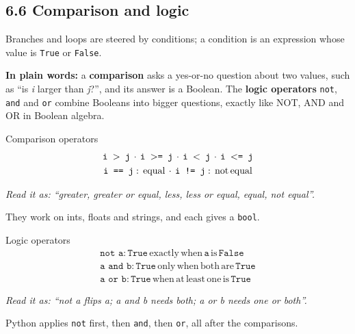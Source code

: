 \documentclass[11pt]{article}
\begin{document}
\begin{keepsection}
\section{6.6 Comparison and logic}

Branches and loops are steered by conditions; a condition is an expression whose value is \texttt{True} or \texttt{False}.

\begin{plainbox}\textbf{In plain words:} a \textbf{comparison} asks a yes-or-no question about two values, such as “is \textit{i} larger than \textit{j}?”, and its answer is a Boolean. The \textbf{logic operators} \texttt{not}, \texttt{and} and \texttt{or} combine Booleans into bigger questions, exactly like NOT, AND and OR in Boolean algebra.\end{plainbox}

\begin{equationcard}{Comparison operators}
\[ \begin{gathered} \texttt{i \ensuremath{>} j}\, \cdot \, \texttt{i \ensuremath{>}= j}\, \cdot \, \texttt{i \ensuremath{<} j}\, \cdot \, \texttt{i \ensuremath{<}= j} \\ \texttt{i == j}:\, \text{equal}\, \cdot \, \texttt{i != j}:\, \text{not}\, \text{equal} \end{gathered} \]
{\small \emph{Read it as: “greater, greater or equal, less, less or equal, equal, not equal”.}\par  They work on ints, floats and strings, and each gives a \texttt{bool}.}
\end{equationcard}

\begin{equationcard}{Logic operators}
\[ \begin{gathered} \texttt{not a}:\, \texttt{True}\, \text{exactly}\, \text{when}\, \texttt{a}\, \text{is}\, \texttt{False} \\ \texttt{a and b}:\, \texttt{True}\, \text{only}\, \text{when}\, \text{both}\, \text{are}\, \texttt{True} \\ \texttt{a or b}:\, \texttt{True}\, \text{when}\, \text{at}\, \text{least}\, \text{one}\, \text{is}\, \texttt{True} \end{gathered} \]
{\small \emph{Read it as: “not a flips a; a and b needs both; a or b needs one or both”.}\par  Python applies \texttt{not} first, then \texttt{and}, then \texttt{or}, all after the comparisons.}
\end{equationcard}


\end{keepsection}
\end{document}
